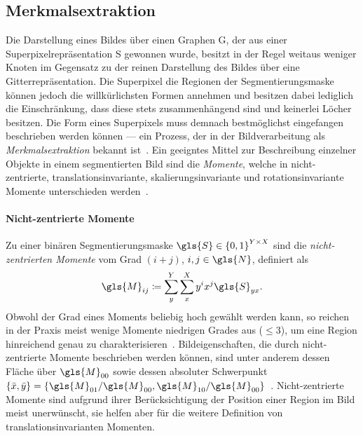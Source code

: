 \subsection{Merkmalsextraktion}
\label{merkmalsextraktion}

Die Darstellung eines Bildes über einen Graphen \gls{G}, der aus einer Superpixelrepräsentation \gls{S} gewonnen wurde, besitzt in der Regel weitaus weniger Knoten im Gegensatz zu der reinen Darstellung des Bildes über eine Gitterrepräsentation.
Die Superpixel \bzw{} die Regionen der Segmentierungsmaske können jedoch die willkürlichsten Formen annehmen und besitzen dabei lediglich die Einschränkung, dass diese stets zusammenhängend sind und keinerlei Löcher besitzen.
Die Form eines Superpixels muss demnach bestmöglichst eingefangen \bzw{} beschrieben werden können — ein Prozess, der in der Bildverarbeitung als \emph{Merkmalsextraktion} bekannt ist~\cite{momente}.
Ein geeigntes Mittel zur Beschreibung einzelner Objekte in einem segmentierten Bild sind die \emph{Momente}, welche in nicht-zentrierte, translationsinvariante, skalierungsinvariante und rotationsinvariante Momente unterschieden werden~\cite{momente}.

\paragraph{Nicht-zentrierte Momente}
\label{nicht_zentrierte_momente}

Zu einer binären Segmentierungsmaske $\gls{S} \in {\left\{0, 1\right\}}^{Y \times X}$ sind die \emph{nicht-zentrierten Momente} vom Grad $\left(i+j\right)$, $i,j\in\gls{N}$, definiert als~\cite{momente}
\begin{equation*}
  \gls{M}_{ij} \coloneqq \sum_y^Y \sum_x^X y^i x^j \gls{S}_{yx}.
\end{equation*}
Obwohl der Grad eines Moments beliebig hoch gewählt werden kann, so reichen in der Praxis meist wenige Momente niedrigen Grades aus ($\le 3$), um eine Region hinreichend genau zu charakterisieren~\cite{momente}.
Bildeigenschaften, die durch nicht-zentrierte Momente beschrieben werden können, sind unter anderem dessen Fläche über $\gls{M}_{00}$ sowie dessen absoluter Schwerpunkt $\left\{\bar{x}, \bar{y}\right\} = \left\{ \gls{M}_{01}/\gls{M}_{00}, \gls{M}_{10}/\gls{M}_{00}\right\}$~\cite{momente}.
Nicht-zentrierte Momente sind aufgrund ihrer Berücksichtigung der Position einer Region im Bild meist unerwünscht, sie helfen aber für die weitere Definition von translationsinvarianten Momenten.

